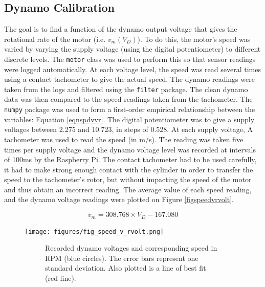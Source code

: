 \documentclass[twoside,a4]{report}
\def\br{\newline \newline \noindent}
\begin{document}
	\subsection*{Dynamo Calibration}
	The goal is to find a function of the dynamo output voltage that gives the rotational rate of the motor (i.e. \(v_m ({V_D})\)). To do this, the motor's speed was varied by varying the supply voltage (using the digital potentiometer) to different discrete levels. The \texttt{motor} class was used to perform this so that sensor readings were logged automatically. At each voltage level, the speed was read several times using a contact tachometer to give the actual speed. The dynamo readings were taken from the logs and filtered using the \texttt{filter} package. The clean dynamo data was then compared to the speed readings taken from the tachometer. The \texttt{numpy} package was used to form a first-order empirical relationship between the variables: Equation \ref{eqnspdvvr}. 
	\br
	The digital potentiometer was to give a supply voltages between 2.275 and 10.723, in steps of 0.528. At each supply voltage, A tachometer was used to read the speed (in m/s). The reading was taken five times per supply voltage and the dynamo voltage level was recorded at intervals of 100ms by the Raspberry Pi. The contact tachometer had to be used carefully, it had to make strong enough contact with the cylinder in order to transfer the speed to the tachometer's rotor, but without impacting the speed of the motor and thus obtain an incorrect reading. The average value of each speed reading, and the dynamo voltage readings were plotted on Figure \ref{figspeedvrvolt}.
	
	\begin{equation}
		v_m = 308.768 \times {V_D} - 167.080
		\label{eqnspdvvr}
	\end{equation}
	
	
	\begin{figure}[!htb]
		\centering
		\texttt{[image: figures/fig\_speed\_v\_rvolt.png]}
		\caption{Dynamo Calibration Results}
		\label{figspeedvrvolt}
		\begin{subfigure}{0.9\textwidth}
			\footnotesize Recorded dynamo voltages and corresponding speed in RPM (blue circles). The error bars represent one standard deviation. Also plotted is a line of best fit (red line).
		\end{subfigure}
	\end{figure}
	
\end{document}
